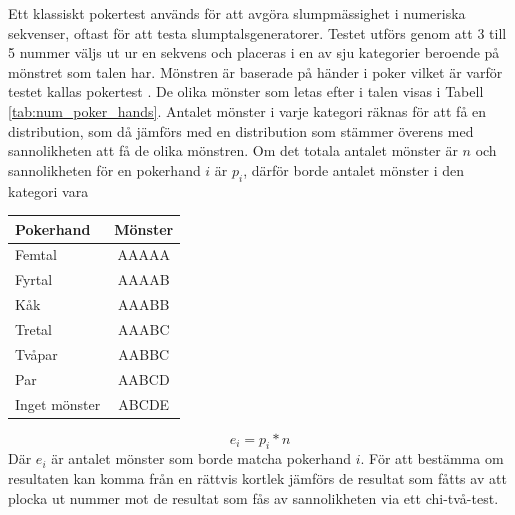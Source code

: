 \documentclass[swedish,a4paper]{article}
\begin{document}

\noindent
\begin{minipage}[t]{0.6\textwidth}
Ett klassiskt pokertest används för att avgöra slump\-mässighet i numeriska 
sekvenser, oftast för att testa slumptalsgeneratorer. Testet utförs genom
att 3 till 5 nummer väljs ut ur en sekvens och placeras i en av sju
kategorier beroende på mönstret som talen har.  Mönstren är baserade på händer i poker vilket är varför testet kallas pokertest \parencite{Abdel2014}. 
De olika mönster som letas efter i talen visas i Tabell \ref{tab:num_poker_hands}.
\indent
 Antalet mönster i varje kategori räknas för att få en distribution, som
 då jämförs med en distribution som stämmer överens med sannolikheten
 att få de olika mönstren. Om det totala antalet mönster är $n$ och
 sannolikheten för en pokerhand $i$ är $p_i$, därför borde antalet mönster i
 den kategori vara 
\end{minipage}%
\hfill
\begin{minipage}[t]{0.40\textwidth}
	\centering
	\captionsetup{width=0.5\textwidth}
    \label{tab:num_poker_hands}
	\begin{tabular}{|l|c|}
	\hline 
	Pokerhand & Mönster \\ \hline  
	Femtal & AAAAA \\ \hline
	Fyrtal & AAAAB \\ \hline
	Kåk & AAABB \\ \hline
	Tretal & AAABC \\ \hline
	Tvåpar & AABBC \\ \hline
	Par & AABCD \\ \hline
    	Inget mönster & ABCDE \\ \hline
	
\end{tabular}
%
\end{minipage}
$$e_i = p_i * n$$
 Där $e_i$ är antalet mönster som
 borde matcha pokerhand $i$. För att bestämma om resultaten kan komma
 från en rättvis kortlek jämförs de resultat som fåtts av att plocka
 ut nummer mot de resultat som fås av sannolikheten via ett chi-två-test.
\end{document}
